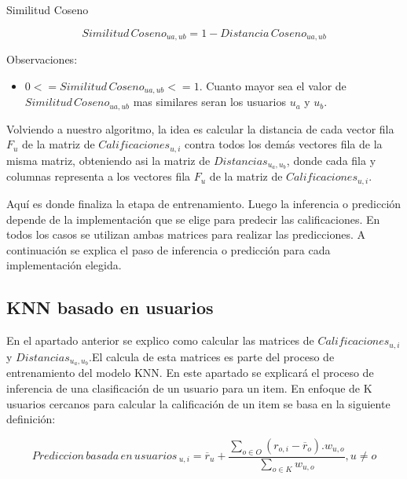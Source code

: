 \documentclass[11pt,a4paper,twoside]{thesis}
\begin{document}
\begin{description}
	\item[Similitud Coseno]
\end{description}
\begin{equation*}
	Similitud \mspace{3mu}Coseno_{ua, ub} = 1- Distancia \mspace{3mu}Coseno_{ua, ub}
\end{equation*}
\begin{description}
	\item[Observaciones:]
\end{description}
\begin{itemize}
	\item $0 <= Similitud \mspace{3mu}Coseno_{ua, ub} <= 1$. Cuanto mayor sea el valor de $Similitud \mspace{3mu}Coseno_{ua, ub}$ mas similares seran los usuarios $u_a$ y $u_b$.
\end{itemize}


Volviendo a nuestro algoritmo, la idea es calcular la distancia de cada vector fila $F_u$ de la matriz de $Calificaciones_{u,i}$ contra todos 
los demás vectores fila de la misma matriz, obteniendo asi la matriz de $Distancias_{u_a,u_b}$, donde cada fila y columnas representa a los 
vectores fila $F_u$ de la matriz de $Calificaciones_{u,i}$. 

Aquí es donde finaliza la etapa de entrenamiento. Luego la inferencia o predicción depende de la implementación que se elige para predecir 
las calificaciones. En todos los casos se utilizan ambas matrices para realizar las predicciones. A continuación se explica el paso de inferencia o 
predicción para cada implementación elegida.

\subsection{KNN basado en usuarios}

En el apartado anterior se explico como calcular las matrices de $Calificaciones_{u,i}$ y $Distancias_{u_a,u_b}$.El calcula de esta 
matrices es parte del proceso de entrenamiento del modelo KNN. En este apartado se explicará el proceso de inferencia de una 
clasificación de un usuario para un item. En enfoque de K usuarios cercanos para calcular la calificación de un item se basa en la siguiente definición:

\begin{equation*}
	Prediccion \mspace{3mu}basada \mspace{3mu}en \mspace{3mu}usuarios\mspace{3mu}_{u, i} = \overline{r}_{u} + \frac{\sum_{o \in O} (r_{o, i} - \overline{r}_o) . w_{u, o} }{ \sum_{o \in K} w_{u, o}}, u \neq o
\end{equation*}
\end{document}
